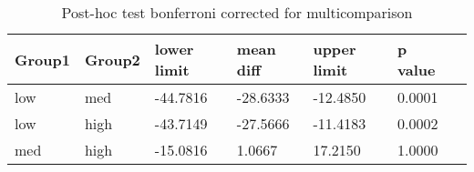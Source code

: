 \begin{table}
\centering
\begin{tabular}[0.2em]{@{}lllllll@{}}\toprule
Group1 & Group2 & lower limit & mean diff & upper limit & p value\\\toprule[0.2em]
low & med & -44.7816 & -28.6333 & -12.4850 & 0.0001 \\\midrule
low & high & -43.7149 & -27.5666 & -11.4183 & 0.0002 \\\midrule
med & high & -15.0816 & 1.0667 & 17.2150 & 1.0000 \\\bottomrule[0.2em]
\end{tabular}
\caption{Post-hoc test bonferroni corrected for multicomparison\label{tabel:null}}
\end{table}
